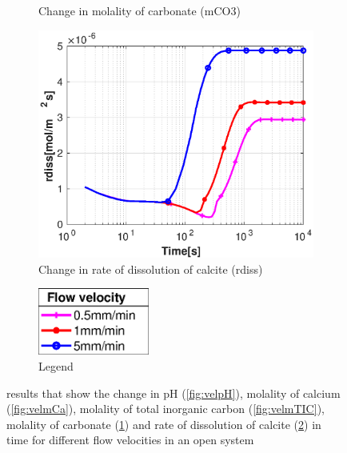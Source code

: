 \begin{figure}[!h]
\begin{subfigure}{.5\linewidth}
        \caption{Change in molality of carbonate (mCO3)}
        \label{fig:velmCO3}
    \end{subfigure}%
    \hfill
    \begin{subfigure}{.5\linewidth}
        \centering
        \includegraphics[width=\textwidth]{PICTURES/with_vel_rdiss.eps}
        \caption{Change in rate of dissolution of calcite (rdiss)}
        \label{fig:velrdiss}
    \end{subfigure}%
    \begin{subfigure}{.5\linewidth}
        \centering
        \includegraphics[width=0.40\textwidth]{PICTURES/with_vel_legend.eps}
        \caption{Legend}
        \label{fig:vellegend}
    \end{subfigure}%
    \hfill
     \caption{\DuMuX results that show the change in pH (\cref{fig:velpH}), molality of calcium (\cref{fig:velmCa}), 
     molality of total inorganic carbon (\cref{fig:velmTIC}), molality of carbonate (\cref{fig:velmCO3}) and rate of 
     dissolution of calcite (\cref{fig:velrdiss}) in time for different flow velocities in an open system}
     \label{fig:comparisionDiffFlowVelocity}
\end{figure}

